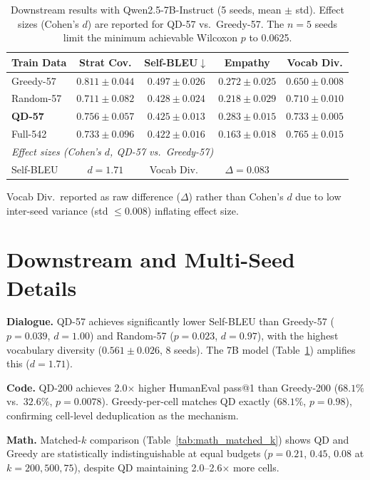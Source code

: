 \documentclass{article}
\theoremstyle{plain}
\theoremstyle{remark}
\begin{document}
\begin{table}[h]
\centering
\caption{Downstream results with Qwen2.5-7B-Instruct (5 seeds, mean $\pm$ std). Effect sizes (Cohen's $d$) are reported for QD-57 vs.\ Greedy-57. The $n{=}5$ seeds limit the minimum achievable Wilcoxon $p$ to 0.0625.}
\label{tab:downstream_7b}
\begin{tabular}{lcccc}
\toprule
\textbf{Train Data} & \textbf{Strat Cov.} & \textbf{Self-BLEU}$\downarrow$ & \textbf{Empathy} & \textbf{Vocab Div.} \\
\midrule
Greedy-57 & $0.811 \pm 0.044$ & $0.497 \pm 0.026$ & $0.272 \pm 0.025$ & $0.650 \pm 0.008$ \\
Random-57 & $0.711 \pm 0.082$ & $0.428 \pm 0.024$ & $0.218 \pm 0.029$ & $0.710 \pm 0.010$ \\
\textbf{QD-57} & $0.756 \pm 0.057$ & $\mathbf{0.425 \pm 0.013}$ & $\mathbf{0.283 \pm 0.015}$ & $\mathbf{0.733 \pm 0.005}$ \\
Full-542 & $0.733 \pm 0.096$ & $0.422 \pm 0.016$ & $0.163 \pm 0.018$ & $0.765 \pm 0.015$ \\
\midrule
\multicolumn{5}{l}{\textit{Effect sizes (Cohen's $d$, QD-57 vs.\ Greedy-57)}} \\
Self-BLEU & $d{=}1.71$ & Vocab Div.\ & $\Delta{=}0.083$ & \\
\bottomrule
\end{tabular}
\vspace{1mm}
{\small Vocab Div.\ reported as raw difference ($\Delta$) rather than Cohen's $d$ due to low inter-seed variance (std ${\leq}0.008$) inflating effect size.}
\end{table}

\section{Downstream and Multi-Seed Details}
\label{sec:app_downstream}

\textbf{Dialogue.}
QD-57 achieves significantly lower Self-BLEU than Greedy-57 ($p{=}0.039$, $d{=}1.00$) and Random-57 ($p{=}0.023$, $d{=}0.97$), with the highest vocabulary diversity ($0.561 \pm 0.026$, 8 seeds).
The 7B model (Table~\ref{tab:downstream_7b}) amplifies this ($d{=}1.71$).

\textbf{Code.}
QD-200 achieves 2.0$\times$ higher HumanEval pass@1 than Greedy-200 ($68.1\%$ vs.\ $32.6\%$, $p{=}0.0078$).
Greedy-per-cell matches QD exactly ($68.1\%$, $p{=}0.98$), confirming cell-level deduplication as the mechanism.

\textbf{Math.}
Matched-$k$ comparison (Table~\ref{tab:math_matched_k}) shows QD and Greedy are statistically indistinguishable at equal budgets ($p{=}0.21$, $0.45$, $0.08$ at $k{=}200,500,75$), despite QD maintaining 2.0--2.6$\times$ more cells.
\end{document}
